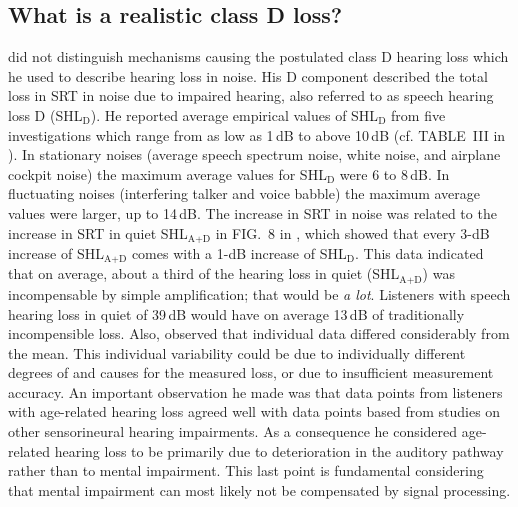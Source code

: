 \documentclass[10pt,a4paper,twocolumn]{article}
\begin{document}
\subsection*{What is a realistic class D loss?}
%
\cite{plomp1978} did not distinguish mechanisms causing the postulated class D hearing loss which he used to describe hearing loss in noise.
%
His D component described the total loss in SRT in noise due to impaired hearing, also referred to as speech hearing loss D (SHL$_\text{D}$).
%
He reported average empirical values of SHL$_\text{D}$ from five investigations which range from as low as 1\,dB to above 10\,dB (cf. TABLE~III in \cite{plomp1978}).
%
In stationary noises (average speech spectrum noise, white noise, and airplane cockpit noise) the maximum average values for SHL$_\text{D}$ were 6 to 8\,dB.
%
In fluctuating noises (interfering talker and voice babble) the maximum average values were larger, up to 14\,dB.
%
The increase in SRT in noise was related to the increase in SRT in quiet SHL$_\text{A+D}$ in FIG.~8 in \cite{plomp1978}, which showed that every 3-dB increase of SHL$_\text{A+D}$ comes with a 1-dB increase of SHL$_\text{D}$.
%
This data indicated that on average, about a third of the hearing loss in quiet (SHL$_\text{A+D}$) was incompensable by simple amplification; that would be \emph{a lot}.
%
Listeners with speech hearing loss in quiet of 39\,dB would have on average 13\,dB of traditionally incompensible loss.
%
Also, \cite{plomp1978} observed that individual data differed considerably from the mean.
%
This individual variability could be due to individually different degrees of and causes for the measured loss, or due to insufficient measurement accuracy.
%
An important observation he made was that data points from listeners with age-related hearing loss agreed well with data points based from studies on other sensorineural hearing impairments.
%
As a consequence he considered age-related hearing loss to be primarily due to deterioration in the auditory pathway rather than to mental impairment.
%
This last point is fundamental considering that mental impairment can most likely not be compensated by signal processing.
\end{document}
